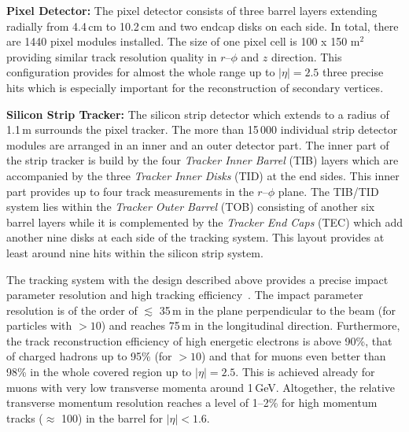 \begin{description}
 \item \textbf{Pixel Detector:} The pixel detector consists of three barrel layers extending radially from 4.4\,cm to 10.2\,cm and two endcap disks on each side. In total, there are 1440 pixel modules installed. The size of one pixel cell is 100 x 150 \textmu m$^2$ providing similar track resolution quality in $r$--$\phi$ and $z$ direction. This configuration provides for almost the whole range up to $|\eta| = 2.5$ three precise hits which is especially important for the reconstruction of secondary vertices.
 \item \textbf{Silicon Strip Tracker:} The silicon strip detector which extends to a radius of 1.1\,m surrounds the pixel tracker. The more than 15\,000 individual strip detector modules are arranged in an inner and an outer detector part. The inner part of the strip tracker is build by the four \textit{Tracker Inner Barrel} (TIB) layers which are accompanied by the three \textit{Tracker Inner Disks} (TID) at the end sides. This inner part provides up to four track measurements in the $r$--$\phi$ plane. The TIB/TID system lies within the \textit{Tracker Outer Barrel} (TOB) consisting of another six barrel layers while it is complemented by the \textit{Tracker End Caps} (TEC) which add another nine disks at each side of the tracking system. This layout provides at least around nine hits within the silicon strip system. 
\end{description}
The tracking system with the design described above provides a precise impact parameter resolution and high tracking efficiency~\cite{bib:cmstdr:tracker}. The impact parameter resolution is of the order of $\lesssim$ 35\,\textmu m in the plane perpendicular to the beam (for particles with \pt$> 10$\gev) and reaches 75\,\textmu m in the longitudinal direction. Furthermore, the track reconstruction efficiency of high energetic electrons is above 90\%, that of charged hadrons up to 95\% (for \pt$> 10$\gev) and that for muons even better than 98\% in the whole covered region up to $|\eta| = 2.5$. This is achieved already for muons with very low transverse momenta around 1\,GeV. Altogether, the relative transverse momentum resolution reaches a level of 1--2\% for high momentum tracks ($\approx$ 100\gev) in the barrel for $|\eta| < 1.6$.
 
